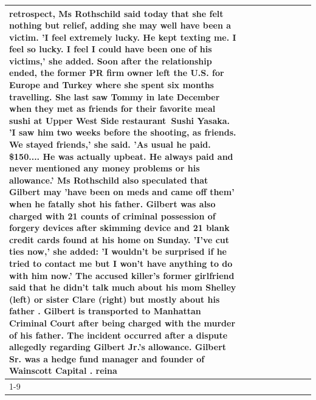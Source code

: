 \begin{table}[H]
\begin{tabular}{lllrlllll}
retrospect, Ms Rothschild said today that she felt nothing but relief, adding she may well have been a victim. 'I feel extremely lucky. He kept texting me. I feel so lucky. I feel I could have been one of his victims,' she added. Soon after the relationship ended, the former PR firm owner left the U.S. for Europe and Turkey where she spent six months  travelling. She last saw Tommy in late December when they met as friends for their favorite meal sushi at Upper West Side restaurant Sushi Yasaka. 'I saw him two weeks before the shooting, as friends. We stayed friends,' she said. 'As usual he paid. \$150.... He was actually upbeat. He always paid and never mentioned any money problems or his allowance.' Ms Rothschild also speculated that Gilbert may 'have been on meds and came off them' when he fatally shot his father. Gilbert was also charged with 21 counts of criminal possession of forgery devices after skimming device and 21 blank credit cards found at his home on Sunday. 'I've cut ties now,' she added: 'I wouldn’t be surprised if he tried to contact me but I won’t have anything to do with him now.' The accused killer's former girlfriend said that he didn't talk much about his mom Shelley (left) or sister Clare (right) but mostly about his father . Gilbert is transported to Manhattan Criminal Court  after being charged with the murder of his father. The incident occurred after a dispute allegedly regarding Gilbert Jr.'s allowance. Gilbert Sr. was a hedge fund manager and founder of Wainscott Capital . reina \\
\cline{1-9}

\end{tabular}
\end{table}
